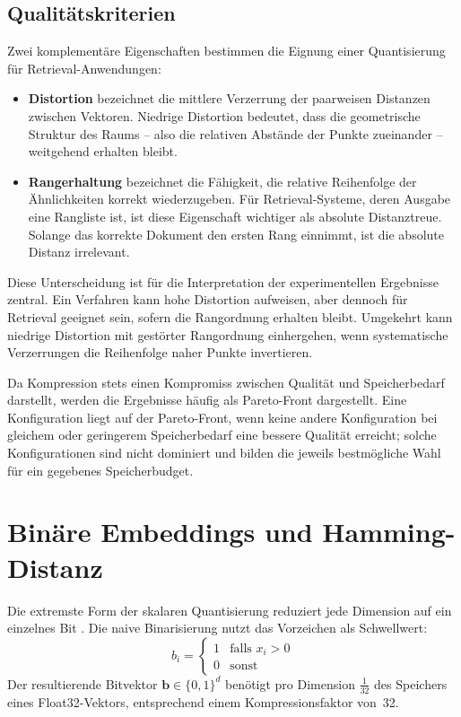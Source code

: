 \subsection{Qualitätskriterien}
%
Zwei komplementäre Eigenschaften bestimmen die Eignung einer Quantisierung für Retrieval-Anwendungen:
\begin{itemize}
  \item \textbf{Distortion} bezeichnet die mittlere Verzerrung der paarweisen Distanzen zwischen Vektoren.
Niedrige Distortion bedeutet, dass die geometrische Struktur des Raums -- also die relativen Abstände der Punkte zueinander -- weitgehend erhalten bleibt.
  \item \textbf{Rangerhaltung} bezeichnet die Fähigkeit, die relative Reihenfolge der Ähnlichkeiten korrekt wiederzugeben.
Für Retrieval-Systeme, deren Ausgabe eine Rangliste ist, ist diese Eigenschaft wichtiger als absolute Distanztreue.
Solange das korrekte Dokument den ersten Rang einnimmt, ist die absolute Distanz irrelevant.
\end{itemize}
%
Diese Unterscheidung ist für die Interpretation der experimentellen Ergebnisse zentral.
Ein Verfahren kann hohe Distortion aufweisen, aber dennoch für Retrieval geeignet sein, sofern die Rangordnung erhalten bleibt.
Umgekehrt kann niedrige Distortion mit gestörter Rangordnung einhergehen, wenn systematische Verzerrungen die Reihenfolge naher Punkte invertieren.
\par
Da Kompression stets einen Kompromiss zwischen Qualität und Speicherbedarf darstellt, werden die Ergebnisse häufig als Pareto-Front dargestellt.
Eine Konfiguration liegt auf der Pareto-Front, wenn keine andere Konfiguration bei gleichem oder geringerem Speicherbedarf eine bessere Qualität erreicht; solche Konfigurationen sind nicht dominiert und bilden die jeweils bestmögliche Wahl für ein gegebenes Speicherbudget.
%
%
\section{Binäre Embeddings und Hamming-Distanz}
\label{sec:grundlagen_binaer}
%
Die extremste Form der skalaren Quantisierung reduziert jede Dimension auf ein einzelnes Bit \cite{charikar_2002_simhash,gong_2013_itq,shakir_2024_embedding_quantization}.
Die naive Binarisierung nutzt das Vorzeichen als Schwellwert:
\begin{equation}
\label{eq:binarize}
  b_i = \begin{cases} 1 & \text{falls } x_i > 0 \\ 0 & \text{sonst} \end{cases}
\end{equation}
%
Der resultierende Bitvektor $\mathbf{b} \in \{0, 1\}^d$ benötigt pro Dimension $\frac{1}{32}$ des Speichers eines Float32-Vektors, entsprechend einem Kompressionsfaktor von~32.
%

